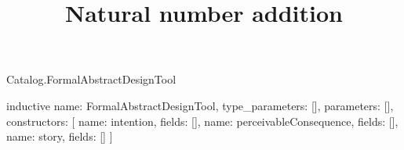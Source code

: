 \begin{lexlean}{Catalog.FormalAbstractDesignTool}
\title{Natural number addition}
\begin{semanticmodule}
inductive{
  name: FormalAbstractDesignTool,
  type_parameters: [],
  parameters: [],
  constructors: [
    {name: intention, fields: []},
    {name: perceivableConsequence, fields: []},
    {name: story, fields: []}
  ]
}
\end{semanticmodule}
\end{lexlean}
